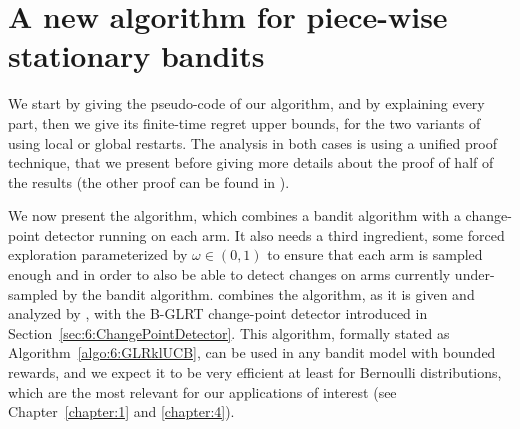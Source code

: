\section{A new algorithm for piece-wise stationary bandits}
\label{sec:6:GLRklUCB_Algorithm}

We start by giving the pseudo-code of our algorithm, and by explaining every part, then we give its finite-time regret upper bounds, for the two variants of using local or global restarts.
The analysis in both cases is using a unified proof technique, that we present before giving more details about the proof of half of the results (the other proof can be found in \cite{Besson2019GLRT}).



We now present the \GLRklUCB{} algorithm, which combines a bandit algorithm with a change-point detector running on each arm.
It also needs a third ingredient, some forced exploration parameterized by $\omega\in(0,1)$ to ensure that each arm is sampled enough and in order to also be able to detect changes on arms currently under-sampled by the bandit algorithm.
%
\GLRklUCB{} combines the \klUCB{} algorithm, as it is given and analyzed by \cite{KLUCBJournal}, with the B-GLRT change-point detector introduced in Section~\ref{sec:6:ChangePointDetector}.
%
This algorithm, formally stated as Algorithm~\ref{algo:6:GLRklUCB}, can be used in any bandit model with bounded rewards, and we expect it to be very efficient at least for Bernoulli distributions, which are the most relevant for our applications of interest (see Chapter~\ref{chapter:1} and \ref{chapter:4}).

